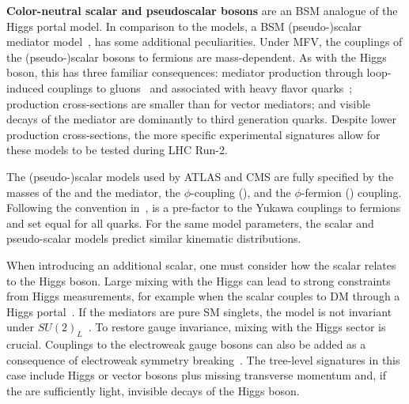 \textbf{Color-neutral scalar and pseudoscalar bosons} are an BSM analogue of the Higgs portal model. In comparison to the \Zprime models, a BSM (pseudo-)scalar mediator model~\cite{Buckley:2014fba},  
has some additional peculiarities. 
Under MFV, the couplings of the (pseudo-)scalar bosons to fermions are mass-dependent. As with the Higgs boson, this has three familiar consequences: mediator production through loop-induced couplings to gluons~\cite{Haisch:2015ioa} and associated with heavy flavor quarks~\cite{Buckley:2014fba};
    production cross-sections are smaller than for vector mediators;
    and visible decays of the mediator are dominantly to third generation quarks. 
Despite lower production cross-sections, the more specific experimental signatures allow for these models to be tested during LHC Run-2.

The (pseudo-)scalar models used by ATLAS and CMS are fully specified by the masses of the \IP and the mediator, the $\phi$-\IP coupling (\gdm), and the $\phi$-fermion (\gq) coupling.
Following the convention in~\cite{Abercrombie:2015wmb}, \gq is a pre-factor to the Yukawa couplings to fermions and set equal for all quarks.
For the same model parameters, the scalar and pseudo-scalar models predict similar kinematic distributions.

When introducing an additional scalar, one must consider how the scalar relates to the Higgs boson. Large mixing with the Higgs can lead to strong constraints from Higgs measurements, for example when the scalar couples to DM through a Higgs portal~\cite{Berlin:2014cfa}. %
If the mediators are pure SM singlets, the model is not invariant under $SU(2)_L$~\cite{Bell:2016ekl}. 
To restore gauge invariance, mixing with the Higgs sector is crucial. 
Couplings to the electroweak gauge bosons can also be added as a consequence of electroweak symmetry breaking~\cite{Bauer:2016gys,Englert:2016joy}. The tree-level signatures in this case include Higgs or vector bosons plus missing transverse momentum and, if the \IP are sufficiently light, invisible decays of the Higgs boson.


